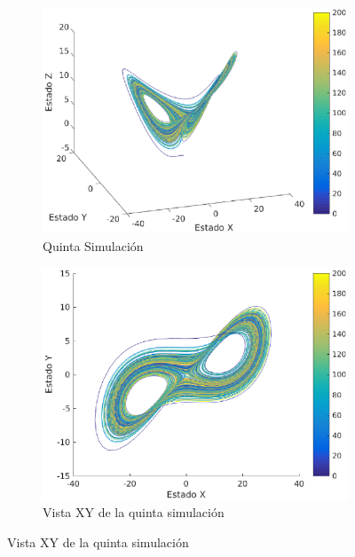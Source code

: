 \documentclass[12pt,letterpaper]{article}
\begin{document}

\begin{figure}
	\centering
	\begin{subfigure}[t]{0.36\textwidth}
		\includegraphics[width=\textwidth]{pictures/quinta_simulacion}
		\caption{Quinta Simulación}
		\label{fig:simulacion5}
	\end{subfigure}
	\begin{subfigure}[t]{0.36\textwidth}
		\includegraphics[width=\textwidth]{pictures/quinta_simulacion_xy}
		\caption{Vista XY de la quinta simulación}
		\label{fig:simulacion5xy}

\end{subfigure}
\end{figure}
\end{document}
